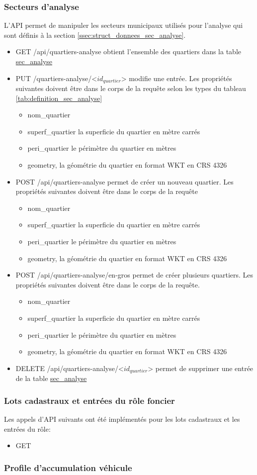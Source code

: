 \subsubsection{Secteurs d'analyse}
L'\ac{API} permet de manipuler les secteurs municipaux utilisés pour l'analyse qui sont définis à la section \ref{ssec:struct_donnees_sec_analyse}.
\begin{itemize}
    \item GET /api/quartiers-analyse obtient l'ensemble des quartiers dans la table \ul{sec\_analyse}
    \item PUT /quartiers-analyse/<$id_{quartier}$> modifie une entrée. Les propriétés suivantes doivent être dans le corps de la requête selon les types du tableau \ref{tab:definition_sec_analyse}
        \begin{itemize}
            \item nom\_quartier
            \item superf\_quartier la superficie du quartier en mètre carrés
            \item peri\_quartier le périmètre du quartier en mètres
            \item geometry, la géométrie du quartier en format WKT en CRS 4326
        \end{itemize}
    \item POST /api/quartiers-analyse permet de créer un nouveau quartier. Les propriétés suivantes doivent être dans le corps de la requête
        \begin{itemize}
            \item nom\_quartier
            \item superf\_quartier la superficie du quartier en mètre carrés
            \item peri\_quartier le périmètre du quartier en mètres
            \item geometry, la géométrie du quartier en format WKT en CRS 4326
        \end{itemize}
    \item POST /api/quartiers-analyse/en-gros permet de créer plusieurs quartiers. Les propriétés suivantes doivent être dans le corps de la requête.
        \begin{itemize}
            \item nom\_quartier
            \item superf\_quartier la superficie du quartier en mètre carrés
            \item peri\_quartier le périmètre du quartier en mètres
            \item geometry, la géométrie du quartier en format WKT en CRS 4326
        \end{itemize}
    \item DELETE /api/quartiers-analyse/<$id_{quartier}$> permet de supprimer une entrée de la table \ul{sec\_analyse}
\end{itemize}
\subsubsection{Lots cadastraux et entrées du rôle foncier}
Les appels d'\ac{API} suivants ont été implémentés pour les lots cadastraux et les entrées du rôle:
\begin{itemize}
    \item GET
\end{itemize}
\subsubsection{Profile d'accumulation véhicule}